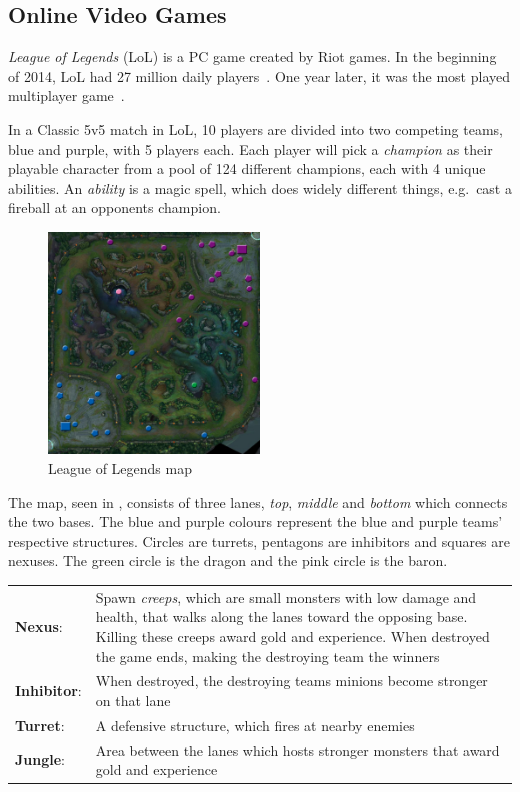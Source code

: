\subsection{Online Video Games}\label{sec:onlinevideogames}
\emph{League of Legends} (LoL) is a PC game created by Riot games. In the beginning of 2014, LoL had 27 million daily players~\cite{LoL27mill}. One year later, it was the most played multiplayer game~\cite{LoLmostplayed}.

In a Classic 5v5 match in LoL, 10 players are divided into two competing teams, blue and purple, with 5 players each. Each player will pick a \emph{champion} as their playable character from a pool of 124 different champions, each with 4 unique abilities. An \emph{ability} is a magic spell, which does widely different things, e.g.\ cast a fireball at an opponents champion.

\begin{figure}[!htb]
  \centering
    \includegraphics[width=0.5\textwidth]{img/lolmap.jpg}
  \caption{League of Legends map~\cite{lolmap}}\label{fig:lolmap}
\end{figure}

The map, seen in , consists of three lanes, \emph{top}, \emph{middle} and \emph{bottom} which connects the two bases. The blue and purple colours represent the blue and purple teams' respective structures. Circles are turrets, pentagons are inhibitors and squares are nexuses. The green circle is the dragon and the pink circle is the baron.

\begin{table}[!h]
  \begin{tabular}{l p{13cm}}
    \textbf{Nexus}: & Spawn \emph{creeps}, which are small monsters with low damage and health, that walks along the lanes toward the opposing base. Killing these creeps award gold and experience. When destroyed the game ends, making the destroying team the winners\\
    \textbf{Inhibitor}: &  When destroyed, the destroying teams minions become stronger on that lane\\
    \textbf{Turret}: & A defensive structure, which fires at nearby enemies\\
    \textbf{Jungle}: & Area between the lanes which hosts stronger monsters that award gold and experience\\
  \end{tabular}
\end{table}

